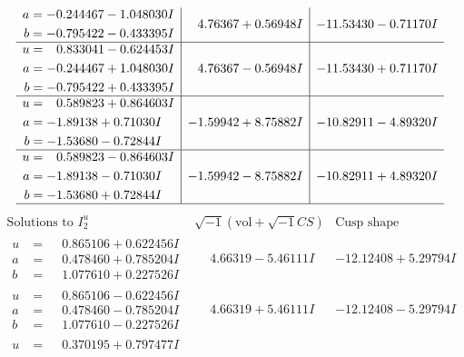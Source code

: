 \documentclass[1p]{elsarticle_modified}
\theoremstyle{definition}
\newcommand{\I}{\sqrt{-1}}
\begin{document}
$$\begin{array}{c|c|c}
\begin{aligned}
a &= -0.244467 - 1.048030 I \\
b &= -0.795422 - 0.433395 I\end{aligned}
 & \phantom{-}4.76367 + 0.56948 I & -11.53430 - 0.71170 I \\ \hline\begin{aligned}
u &= \phantom{-}0.833041 - 0.624453 I \\
a &= -0.244467 + 1.048030 I \\
b &= -0.795422 + 0.433395 I\end{aligned}
 & \phantom{-}4.76367 - 0.56948 I & -11.53430 + 0.71170 I \\ \hline\begin{aligned}
u &= \phantom{-}0.589823 + 0.864603 I \\
a &= -1.89138 + 0.71030 I \\
b &= -1.53680 - 0.72844 I\end{aligned}
 & -1.59942 + 8.75882 I & -10.82911 - 4.89320 I \\ \hline\begin{aligned}
u &= \phantom{-}0.589823 - 0.864603 I \\
a &= -1.89138 - 0.71030 I \\
b &= -1.53680 + 0.72844 I\end{aligned}
 & -1.59942 - 8.75882 I & -10.82911 + 4.89320 I\\
 \hline 
 \end{array}$$\newpage$$\begin{array}{c|c|c}  
\text{Solutions to }I^u_{2}& \I (\text{vol} + \sqrt{-1}CS) & \text{Cusp shape}\\
 \hline 
\begin{aligned}
u &= \phantom{-}0.865106 + 0.622456 I \\
a &= \phantom{-}0.478460 + 0.785204 I \\
b &= \phantom{-}1.077610 + 0.227526 I\end{aligned}
 & \phantom{-}4.66319 - 5.46111 I & -12.12408 + 5.29794 I \\ \hline\begin{aligned}
u &= \phantom{-}0.865106 - 0.622456 I \\
a &= \phantom{-}0.478460 - 0.785204 I \\
b &= \phantom{-}1.077610 - 0.227526 I\end{aligned}
 & \phantom{-}4.66319 + 5.46111 I & -12.12408 - 5.29794 I \\ \hline\begin{aligned}
u &= \phantom{-}0.370195 + 0.797477 I \\

\end{aligned}
\end{array}$$
\end{document}

